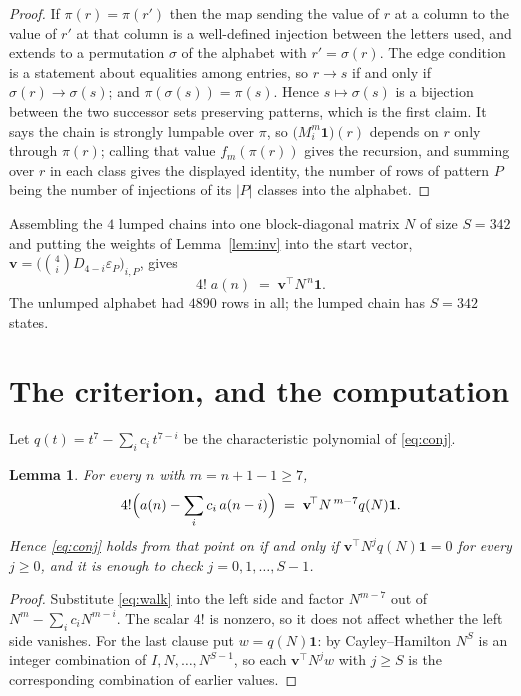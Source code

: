 \documentclass[11pt,a4paper]{article}
\theoremstyle{plain}
\newtheorem{lemma}[theorem]{Lemma}
\theoremstyle{definition}
\begin{document}
\begin{proof}
If $\pi(r)=\pi(r')$ then the map sending the value of $r$ at a column to the value of $r'$
at that column is a well-defined injection between the letters used, and extends to a
permutation $\sigma$ of the alphabet with $r'=\sigma(r)$. The edge condition is a statement
about equalities among entries, so $r\to s$ if and only if $\sigma(r)\to\sigma(s)$; and
$\pi(\sigma(s))=\pi(s)$. Hence $s\mapsto\sigma(s)$ is a bijection between the two successor
sets preserving patterns, which is the first claim. It says the chain is strongly lumpable
over $\pi$, so $\bigl(M_i^{m}\mathbf{1}\bigr)(r)$ depends on $r$ only through $\pi(r)$;
calling that value $f_m(\pi(r))$ gives the recursion, and summing over $r$ in each class
gives the displayed identity, the number of rows of pattern $P$ being the number of
injections of its $|P|$ classes into the alphabet.
\end{proof}

Assembling the $4$ lumped chains into one block-diagonal matrix $N$ of size $S=342$ and
putting the weights of Lemma~\ref{lem:inv} into the start vector,
$\mathbf{v}=\bigl(\binom{4}{i}D_{4-i}\varepsilon_P\bigr)_{i,P}$, gives
\begin{equation}\label{eq:walk}
4!\;a(n)\;=\;\mathbf{v}^{\!\top}N^{\,n}\mathbf{1} .
\end{equation}
The unlumped alphabet had $4890$ rows in all; the lumped chain has $S=342$ states.

\section{The criterion, and the computation}

Let $q(t)=t^{7}-\sum_i c_i\,t^{7-i}$ be the characteristic polynomial of
\eqref{eq:conj}.

\begin{lemma}\label{lem:crit}
For every $n$ with $m=n+1-1\ge7$,
\[
4!\Bigl(a(n)-\sum_i c_i\,a(n-i)\Bigr)\;=\;\mathbf{v}^{\!\top}N^{\,m-7}q(N)\mathbf{1} .
\]
Hence \eqref{eq:conj} holds from that point on if and only if
$\mathbf{v}^{\!\top}N^{j}q(N)\mathbf{1}=0$ for every $j\ge0$, and it is enough to check
$j=0,1,\dots,S-1$.
\end{lemma}

\begin{proof}
Substitute \eqref{eq:walk} into the left side and factor $N^{m-7}$ out of
$N^{m}-\sum_i c_iN^{m-i}$. The scalar $4!$ is nonzero, so it does not affect whether
the left side vanishes. For the last clause put $w=q(N)\mathbf{1}$: by Cayley--Hamilton
$N^{S}$ is an integer combination of $I,N,\dots,N^{S-1}$, so each
$\mathbf{v}^{\!\top}N^{j}w$ with $j\ge S$ is the corresponding combination of earlier
values.
\end{proof}
\end{document}
